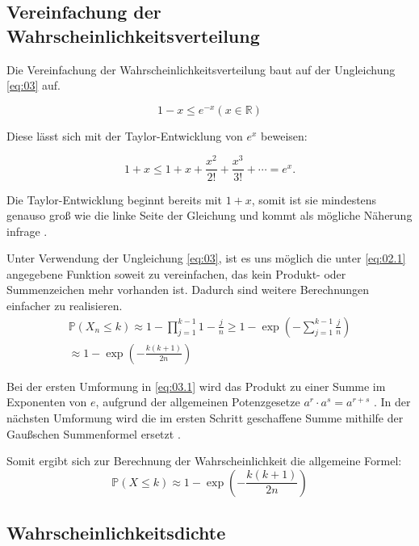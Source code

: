 \documentclass[../main.tex]{subfiles}
\begin{document}
\begin{flushleft}
\subsection{Vereinfachung der Wahrscheinlichkeitsverteilung}

Die Vereinfachung der Wahrscheinlichkeitsverteilung baut auf der Ungleichung \ref{eq:03} auf.

\begin{equation}
1 - x \leq e^{ -x } (x \in \mathbb{R}) \label{eq:03}
\end{equation}

Diese lässt sich mit der Taylor-Entwicklung von $e^x$ beweisen:

\begin{equation}
1 + x \leq 1 + x + \frac{x^2}{2!} + \frac{x^3}{3!} + \cdots = e^x.
\end{equation}

Die Taylor-Entwicklung beginnt bereits mit $1+x$, somit ist sie mindestens genauso groß wie die linke Seite der Gleichung und kommt als mögliche Näherung infrage \cite[560ff]{papula}. \newline

Unter Verwendung der Ungleichung \ref{eq:03}, ist es uns möglich die unter \ref{eq:02.1} angegebene Funktion soweit zu vereinfachen, das kein Produkt- oder Summenzeichen mehr vorhanden ist. Dadurch sind weitere Berechnungen einfacher zu realisieren.
\begin{eqnarray}
\mathbb{P}(X_{ n } \leq k) \approx 1 - \prod_{ j = 1 }^{ k - 1 }{ 1 - \frac{ j }{ n } } \geq 1 - \exp( - \sum_{ j = 1 }^{ k - 1 }{ \frac{ j }{ n } } )  \label{eq:03.1}\\
\approx 1 - \exp( - \frac{ k (k + 1) }{ 2n } )  \label{eq:03.2}
\end{eqnarray}

Bei der ersten Umformung in \ref{eq:03.1} wird das Produkt zu einer Summe im Exponenten von $e$, aufgrund der allgemeinen Potenzgesetze  $a^{ r } \cdot a^{ s } = a^{ r + s }$ \cite[267]{papula}. In der nächsten Umformung wird die im ersten Schritt geschaffene Summe mithilfe der Gaußschen Summenformel ersetzt \cite[9ff]{petkovsek1996b}. \newline

Somit ergibt sich zur Berechnung der Wahrscheinlichkeit die allgemeine Formel:
\begin{equation}
\mathbb{P}(X \leq k) \approx 1 - \exp( - \frac{ k (k + 1) }{ 2n } ) \label{eq:04}
\end{equation}
\subsection{Wahrscheinlichkeitsdichte}


\end{flushleft}
\end{document}
